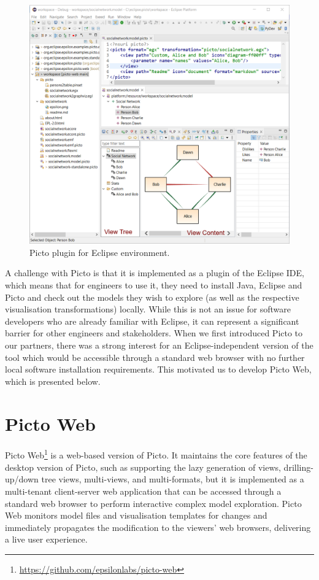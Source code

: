 \documentclass[sigconf,review]{acmart}
\begin{document}
\begin{figure}
  \centering
  \includegraphics[width=\linewidth]{images/picto-eclipse.png}
  \caption{Picto plugin for Eclipse environment.}
  \label{fig:picto-eclipse}
\end{figure}

A challenge with Picto is that it is implemented as a plugin of the Eclipse IDE, which means that for engineers to use it, they need to install Java, Eclipse and Picto and check out the models they wish to explore (as well as the respective visualisation transformations) locally. While this is not an issue for software developers who are already familiar with Eclipse, it can represent a significant barrier for other engineers and stakeholders. When we first introduced Picto to our partners, there was a strong interest for an Eclipse-independent version of the tool which would be accessible through a standard web browser with no further local software installation requirements. This motivated us to develop Picto Web, which is presented below.

\section{Picto Web}

Picto Web\footnote{\url{https://github.com/epsilonlabs/picto-web}} is a web-based version of Picto. 
It maintains the core features of the desktop version of Picto, such as supporting the lazy generation of views, drilling-up/down tree views, multi-views, and multi-formats, but it is implemented as a multi-tenant client-server web application that can be accessed through a standard web browser to perform interactive complex model exploration. 
Picto Web monitors model files and visualisation templates for changes and immediately propagates the modification to the viewers' web browsers, delivering a live user experience.
\end{document}
